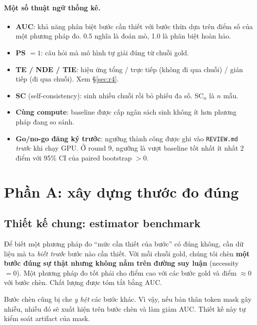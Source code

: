 \documentclass[11pt]{article}
\begin{document}
\paragraph{Một số thuật ngữ thống kê.}
\begin{itemize}[leftmargin=*,itemsep=1pt]
\item \textbf{AUC}: khả năng phân biệt bước cần thiết với bước thừa dựa trên điểm số của một
  phương pháp đo. 0.5 nghĩa là đoán mò, 1.0 là phân biệt hoàn hảo.
\item \textbf{PS $=1$}: câu hỏi mà mô hình tự giải đúng từ chuỗi gold.
\item \textbf{TE / NDE / TIE}: hiệu ứng tổng / trực tiếp (không đi qua chuỗi) / gián tiếp (đi qua
  chuỗi). Xem \S\ref{sec:r4}.
\item \textbf{SC} (self-consistency): sinh nhiều chuỗi rồi bỏ phiếu đa số. SC$_n$ là $n$ mẫu.
\item \textbf{Cùng compute}: baseline được cấp ngân sách sinh không ít hơn phương pháp đang so sánh.
\item \textbf{Go/no-go đăng ký trước}: ngưỡng thành công được ghi vào \texttt{REVIEW.md}
  \emph{trước} khi chạy GPU. Ở round 9, ngưỡng là vượt baseline tốt nhất ít nhất 2 điểm với 95\%
  CI của paired bootstrap $>0$.
\end{itemize}

\section{Phần A: xây dựng thước đo đúng}

\subsection{Thiết kế chung: estimator benchmark}

\begin{thietke}
Để biết một phương pháp đo ``mức cần thiết của bước'' có đúng không, cần dữ liệu mà ta \emph{biết
trước} bước nào cần thiết. Với mỗi chuỗi gold, chúng tôi chèn \textbf{một bước đúng sự thật nhưng
không nằm trên đường suy luận} (necessity $=0$). Một phương pháp đo tốt phải cho điểm cao với các
bước gold và điểm $\approx 0$ với bước chèn. Chất lượng được tóm tắt bằng AUC.

Bước chèn cũng bị che \emph{y hệt} các bước khác. Vì vậy, nếu bản thân token mask gây nhiễu, nhiễu
đó sẽ xuất hiện trên bước chèn và làm giảm AUC. Thiết kế này tự kiểm soát artifact của mask.
\end{thietke}
\end{document}
